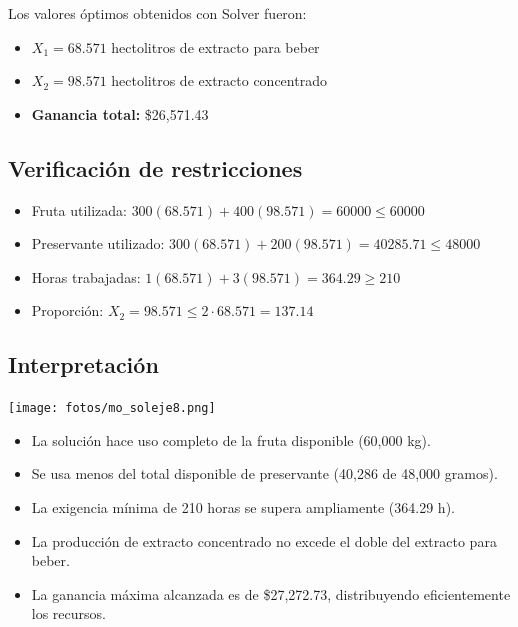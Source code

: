 \documentclass[12pt, a4paper, oneside]{book}
\theoremstyle{definition}
\begin{document}
    Los valores óptimos obtenidos con Solver fueron:

    \begin{itemize}
        \item \( X_1 = 68.571 \) hectolitros de extracto para beber
        \item \( X_2 = 98.571 \) hectolitros de extracto concentrado
        \item \textbf{Ganancia total:} \$26,571.43
    \end{itemize}

    \subsection{Verificación de restricciones}

    \begin{itemize}
        \item Fruta utilizada: \( 300(68.571) + 400(98.571) = 60000 \leq 60000 \)
        \item Preservante utilizado: \( 300(68.571) + 200(98.571) = 40285.71 \leq 48000 \)
        \item Horas trabajadas: \( 1(68.571) + 3(98.571) = 364.29 \geq 210 \)
        \item Proporción: \( X_2 = 98.571 \leq 2 \cdot 68.571 = 137.14 \)
    \end{itemize}

    \subsection{Interpretación}
    \begin{center}
    \texttt{[image: fotos/mo\_soleje8.png]}
    \end{center}

    \begin{itemize}
        \item La solución hace uso completo de la fruta disponible (60,000 kg).
        \item Se usa menos del total disponible de preservante (40,286 de 48,000 gramos).
        \item La exigencia mínima de 210 horas se supera ampliamente (364.29 h).
        \item La producción de extracto concentrado no excede el doble del extracto para beber.
        \item La ganancia máxima alcanzada es de \$27,272.73, distribuyendo eficientemente los recursos.
    \end{itemize}
\end{document}
